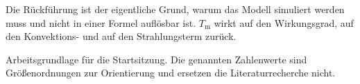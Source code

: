 \documentclass[11pt,a4paper]{article}
\newcommand{\Tm}{T_{\mathrm{m}}}
\begin{document}
\vspace{4ex}

Die Rückführung ist der eigentliche Grund, warum das Modell simuliert werden muss
und nicht in einer Formel auflösbar ist. $\Tm$ wirkt auf den Wirkungsgrad, auf den
Konvektions- und auf den Strahlungsterm zurück.

\vspace{4ex}
{\footnotesize Arbeitsgrundlage für die Startsitzung. Die genannten Zahlenwerte sind
Größenordnungen zur Orientierung und ersetzen die Literaturrecherche nicht.}
\end{document}
